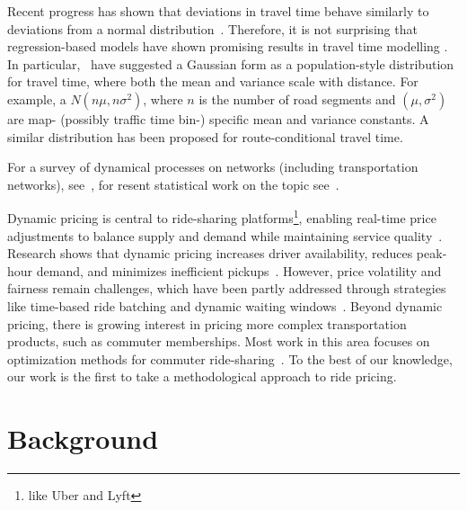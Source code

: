 \documentclass[12pt]{article}
\begin{document}
Recent progress has shown that deviations in travel time behave similarly to deviations from a normal distribution~\cite{elmasri2020predictive, woodard2017predicting}. Therefore, it is not surprising that regression-based models have shown promising results in travel time modelling \citep{westgate2016large, woodard2017predicting,budge2010empirical, westgate2013travel}. In particular,~\cite{elmasri2020predictive} have suggested a Gaussian form as a population-style distribution for travel time, where both the mean and variance scale with distance. For example, a \(N(n\mu, n\sigma^{2})\), where \(n\) is the number of road segments and \((\mu, \sigma^{2})\) are map- (possibly traffic time bin-) specific mean and variance constants. A similar distribution has been proposed for route-conditional travel time. 

For a survey of dynamical processes on networks (including transportation networks), see~\citet[ch. 11]{barrat2008dynamical}, for resent statistical work on the topic see~\citep{kolaczyk2014statistical, snijders2017modeling,burk2007beyond, britton2002bayesian,golightly2005bayesian, bolin2022gaussian}. 

Dynamic pricing is central to ride-sharing platforms\footnote{like Uber and Lyft}, enabling real-time price adjustments to balance supply and demand while maintaining service quality~\citep{banerjee2015pricing, yan2020dynamic}. Research shows that dynamic pricing increases driver availability, reduces peak-hour demand, and minimizes inefficient pickups~\citep{chen2015peeking, hall2015effects}. However, price volatility and fairness remain challenges, which have been partly addressed through strategies like time-based ride batching and dynamic waiting windows~\citep{yan2020dynamic}. Beyond dynamic pricing, there is growing interest in pricing more complex transportation products, such as commuter memberships. Most work in this area focuses on optimization methods for commuter ride-sharing~\citep{WANG2019390, MA2017345}. To the best of our knowledge, our work is the first to take a methodological approach to ride pricing.

\section{Background}\label{sec:background}
\end{document}
